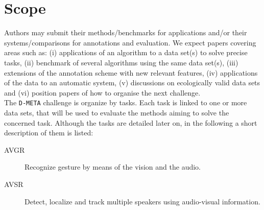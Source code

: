 \documentclass[a4paper]{article}
\begin{document}
% 
% 
% 

\section{Scope}
Authors may submit their methods/benchmarks for applications and/or their systems/comparisons for
annotations and evaluation. We expect papers covering areas such as: (i) applications of an algorithm to a data set(s)
to solve precise tasks, (ii) benchmark of several algorithms using the same data set(s), (iii) extensions of the
annotation scheme with new relevant features, (iv) applications of the data to an automatic system, (v) discussions on
ecologically valid data sets and (vi) position papers of how to organise the next challenge.\vspace{0.2cm}\\
The \texttt{D-META} challenge is organize by tasks. Each task is linked to one or more data sets, that will be used to
evaluate the methods aiming to solve the concerned task. Although the tasks are detailed later on, in the following a
short description of them is listed:
\begin{description}
 \item [AVGR] Recognize gesture by means of the vision and the audio.
 \item [AVSR] Detect, localize and track multiple speakers using audio-visual information.
\end{description}
\end{document}
